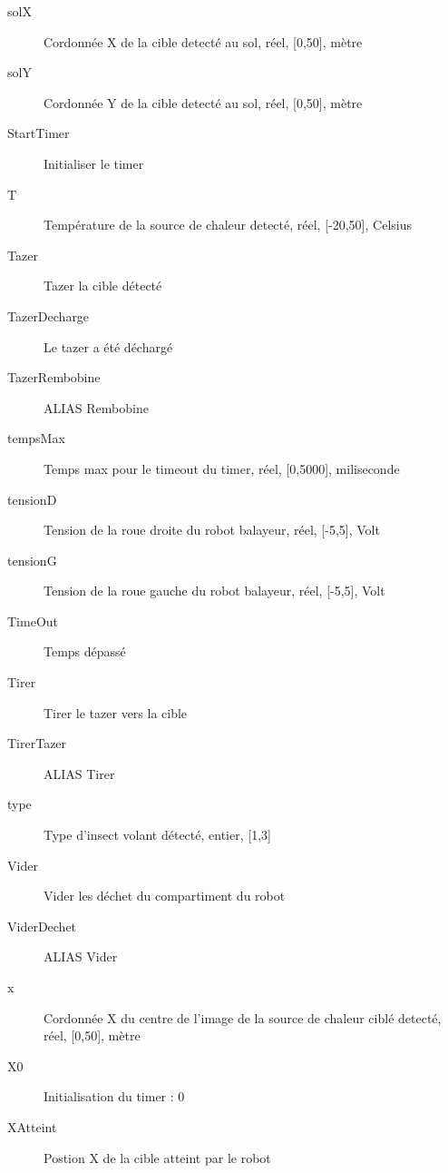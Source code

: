 \begin{description}
	\item [solX]\el
	Cordonnée X de la cible detecté au sol, réel, [0,50], mètre

	\item [solY]\el
	Cordonnée Y de la cible detecté au sol, réel, [0,50], mètre

	\item [StartTimer]\el
	Initialiser le timer

	\item [T]\el
	Température de la source de chaleur detecté, réel, [-20,50], Celsius

	\item [Tazer]\el
	Tazer la cible détecté

	\item [TazerDecharge]\el
	Le tazer a été déchargé

	\item [TazerRembobine]\el
	ALIAS Rembobine

	\item [tempsMax]\el
	Temps max pour le timeout du timer, réel, [0,5000], miliseconde

	\item [tensionD]\el
	Tension de la roue droite du robot balayeur, réel, [-5,5], Volt

	\item [tensionG]\el
	Tension de la roue gauche du robot balayeur, réel, [-5,5], Volt

	\item [TimeOut]\el
	Temps dépassé

	\item [Tirer]\el
	Tirer le tazer vers la cible	

	\item [TirerTazer]\el
	ALIAS Tirer

	\item [type]\el
	Type d'insect volant détecté, entier, [1,3]

	\item [Vider]\el
	Vider les déchet du compartiment du robot

	\item [ViderDechet]\el
	ALIAS Vider

	\item [x]\el
	Cordonnée X du centre de l'image de la source de chaleur ciblé detecté, réel, [0,50], mètre	

	\item [X0]\el
	Initialisation du timer : 0

	\item [XAtteint]\el
	Postion X de la cible atteint par le robot


\end{description}
